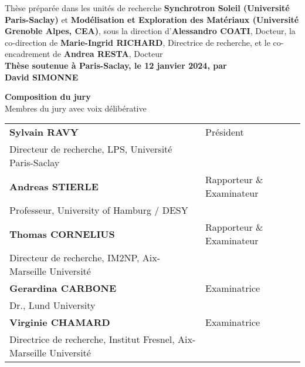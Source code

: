 \begin{titlepage}
\footnotesize Thèse préparée dans les unités de recherche \textbf{Synchrotron Soleil (Université Paris-Saclay)} et \textbf{Modélisation et Exploration des Matériaux (Université Grenoble Alpes, CEA)}, sous la direction d'\textbf{Alessandro COATI}, Docteur, la co-direction de \textbf{Marie-Ingrid RICHARD}, Directrice de recherche, et le co-encadrement de \textbf{Andrea RESTA}, Docteur\\
\vspace{15mm}
\textbf{Thèse soutenue à Paris-Saclay, le 12 janvier 2024, par}\\
\bigskip
\Large {\color{Prune} \textbf{David SIMONNE}}

\vspace{\fill} %

\bigskip
\flushleft
\small {\color{Prune} \textbf{Composition du jury}}\\
{\color{Prune} \scriptsize {Membres du jury avec voix délibérative}} \\
\vspace{2mm}
\scriptsize
\begin{tabular}{|p{10cm}l}
\arrayrulecolor{Prune}
\textbf{Sylvain RAVY} & Président \\
Directeur de recherche, LPS, Université Paris-Saclay & \\
\textbf{Andreas STIERLE} & Rapporteur \& Examinateur \\
Professeur, University of Hamburg / DESY & \\
\textbf{Thomas CORNELIUS} & Rapporteur \& Examinateur \\
Directeur de recherche, IM2NP, Aix-Marseille Université & \\
\textbf{Gerardina CARBONE} & Examinatrice \\
Dr., Lund University & \\
\textbf{Virginie CHAMARD} & Examinatrice \\
Directrice de recherche, Institut Fresnel, Aix-Marseille Université & \\
\end{tabular}
\vspace{6mm}

\end{titlepage}